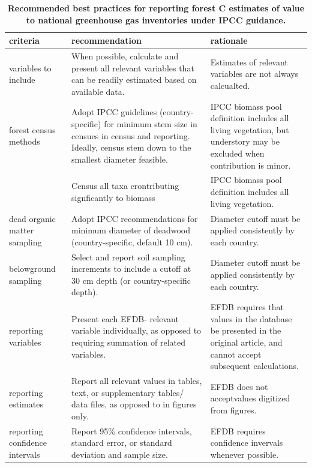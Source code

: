 \documentclass[, manuscript]{copernicus}
\begin{document}
\begin{table}

\caption{\label{tab:table_recommendations}\textbf{Recommended best practices for reporting forest C estimates of value to national greenhouse gas inventories under IPCC guidance.}}
\centering
\fontsize{10}{12}\selectfont
\begin{tabu} to 
\hline
\textbf{criteria} & \textbf{recommendation} & \textbf{rationale}\\
\hline
variables to include & When possible, calculate and present all relevant variables that can be readily estimated based on available data. & Estimates of relevant variables are not always calcualted.\\
\hline
forest census methods & Adopt IPCC guidelines (country-specific) for minimum stem size in censues in census and reporting. Ideally, census stem down to the smallest diameter feasible. & IPCC biomass pool definition includes all living vegetation, but understory may be excluded when contribution is minor.\\
\hline
 & Census all taxa crontributing signficantly to biomass & IPCC biomass pool definition includes all living vegetation.\\
\hline
dead organic matter sampling & Adopt IPCC recommendations for minimum diameter of deadwood (country-specific, default 10 cm). & Diameter cutoff must be applied consistently by each country.\\
\hline
belowground sampling & Select and report soil sampling increments to include a cutoff at 30 cm depth (or country-specific depth). & Diameter cutoff must be applied consistently by each country.\\
\hline
reporting variables & Present each EFDB- relevant variable individually, as opposed to requiring summation of related variables. & EFDB requires that values in the database be presented in the original article, and cannot accept subsequent calculations.\\
\hline
reporting estimates & Report all relevant values in tables, text, or supplementary tables/ data files, as opposed to in figures only. & EFDB does not acceptvalues digitized from figures.\\
\hline
reporting confidence intervals & Report 95\% confidence intervals, standard error, or standard deviation and sample size. & EFDB requires confidence invervals whenever possible.\\
\hline
\end{tabu}
\end{table}
\end{document}
